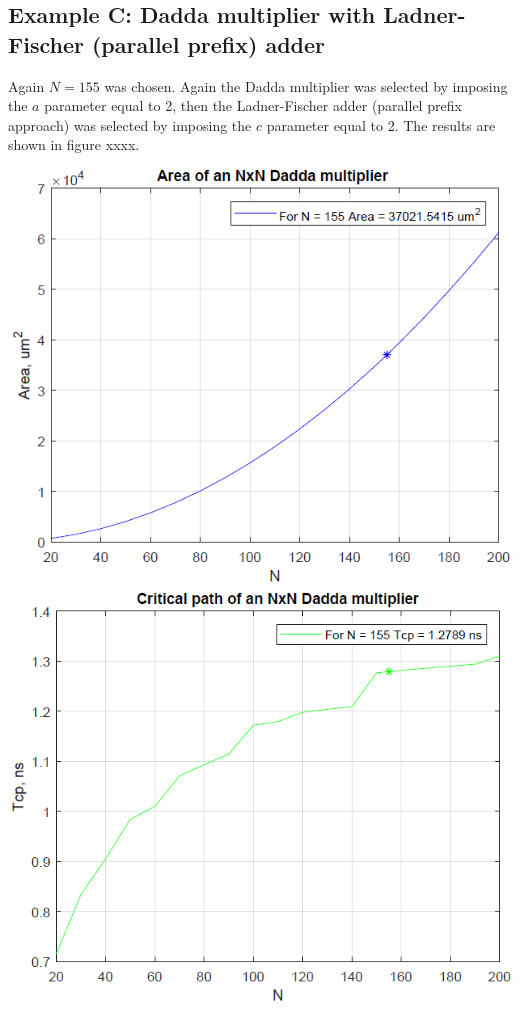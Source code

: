 \documentclass[11pt]{article} %
\begin{document}
\subsection{Example C: Dadda multiplier with Ladner-Fischer (parallel prefix) adder}
Again $N = 155$ was chosen. Again the Dadda multiplier was selected by imposing the $a$ parameter equal to 2, then the Ladner-Fischer adder (parallel prefix approach) was selected by imposing the $c$ parameter equal to 2. The results are shown in figure xxxx.
\vspace{1em}
\begin{center}
\includegraphics[scale=.48]{area_dadda_pp_lf.PNG}
\includegraphics[scale=.48]{tcp_dadda_pp_lf.PNG}\\

\end{center}
\end{document}
